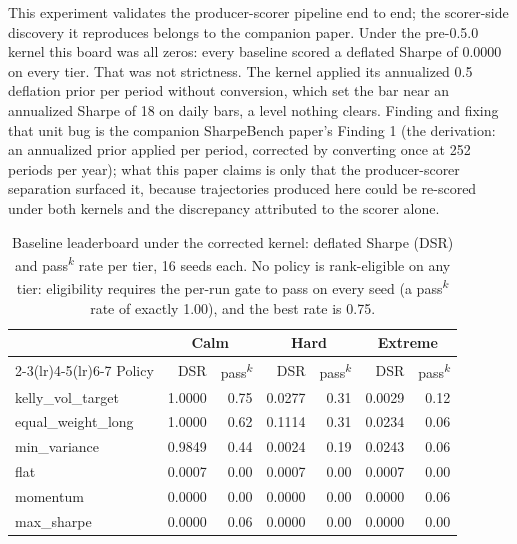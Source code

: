 This experiment validates the producer-scorer pipeline end to end; the scorer-side discovery it reproduces belongs to the companion paper. Under the pre-0.5.0 kernel this board was all zeros: every baseline scored a deflated Sharpe of 0.0000 on every tier. That was not strictness. The kernel applied its annualized 0.5 deflation prior per period without conversion, which set the bar near an annualized Sharpe of 18 on daily bars, a level nothing clears. Finding and fixing that unit bug is the companion SharpeBench paper's Finding 1 \citep{toca2026sharpebench} (the derivation: an annualized prior applied per period, corrected by converting once at 252 periods per year); what this paper claims is only that the producer-scorer separation surfaced it, because trajectories produced here could be re-scored under both kernels and the discrepancy attributed to the scorer alone.

\begin{table}[t]
\centering
\caption{Baseline leaderboard under the corrected kernel: deflated Sharpe (DSR) and pass\textsuperscript{$k$} rate per tier, 16 seeds each. No policy is rank-eligible on any tier: eligibility requires the per-run gate to pass on every seed (a pass\textsuperscript{$k$} rate of exactly 1.00), and the best rate is 0.75.}
\label{tab:f1}
\small
\setlength{\tabcolsep}{4.5pt}
\begin{tabular}{l rr rr rr}
\toprule
 & \multicolumn{2}{c}{Calm} & \multicolumn{2}{c}{Hard} & \multicolumn{2}{c}{Extreme} \\
\cmidrule(lr){2-3}\cmidrule(lr){4-5}\cmidrule(lr){6-7}
Policy & DSR & pass\textsuperscript{$k$} & DSR & pass\textsuperscript{$k$} & DSR & pass\textsuperscript{$k$} \\
\midrule
kelly\_vol\_target & 1.0000 & 0.75 & 0.0277 & 0.31 & 0.0029 & 0.12 \\
equal\_weight\_long & 1.0000 & 0.62 & 0.1114 & 0.31 & 0.0234 & 0.06 \\
min\_variance & 0.9849 & 0.44 & 0.0024 & 0.19 & 0.0243 & 0.06 \\
flat & 0.0007 & 0.00 & 0.0007 & 0.00 & 0.0007 & 0.00 \\
momentum & 0.0000 & 0.00 & 0.0000 & 0.00 & 0.0000 & 0.06 \\
max\_sharpe & 0.0000 & 0.06 & 0.0000 & 0.00 & 0.0000 & 0.00 \\
\bottomrule
\end{tabular}
\end{table}

